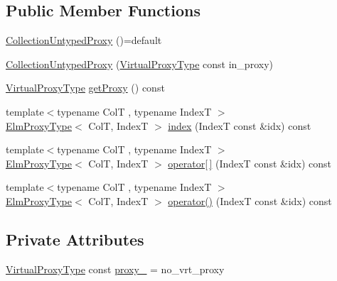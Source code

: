 \subsection*{Public Member Functions}
\begin{DoxyCompactItemize}
\item 
\hyperlink{structvt_1_1vrt_1_1collection_1_1_collection_untyped_proxy_a68c96056ba9d23597086a454e11e4125}{Collection\+Untyped\+Proxy} ()=default
\item 
\hyperlink{structvt_1_1vrt_1_1collection_1_1_collection_untyped_proxy_a8f50964f232f0bf175682933f5c29652}{Collection\+Untyped\+Proxy} (\hyperlink{namespacevt_a1b417dd5d684f045bb58a0ede70045ac}{Virtual\+Proxy\+Type} const in\+\_\+proxy)
\item 
\hyperlink{namespacevt_a1b417dd5d684f045bb58a0ede70045ac}{Virtual\+Proxy\+Type} \hyperlink{structvt_1_1vrt_1_1collection_1_1_collection_untyped_proxy_a4ccee923016e883cd6b131d2ffc156b6}{get\+Proxy} () const
\item 
{\footnotesize template$<$typename ColT , typename IndexT $>$ }\\\hyperlink{structvt_1_1vrt_1_1collection_1_1_collection_untyped_proxy_abf73984f3a31218515f9f4806f41cef5}{Elm\+Proxy\+Type}$<$ ColT, IndexT $>$ \hyperlink{structvt_1_1vrt_1_1collection_1_1_collection_untyped_proxy_a374fa73d81e8cf2fff9f2b9a494db3c8}{index} (IndexT const \&idx) const
\item 
{\footnotesize template$<$typename ColT , typename IndexT $>$ }\\\hyperlink{structvt_1_1vrt_1_1collection_1_1_collection_untyped_proxy_abf73984f3a31218515f9f4806f41cef5}{Elm\+Proxy\+Type}$<$ ColT, IndexT $>$ \hyperlink{structvt_1_1vrt_1_1collection_1_1_collection_untyped_proxy_a04bd48b1cc06e903b520d91d09b01bb3}{operator\mbox{[}$\,$\mbox{]}} (IndexT const \&idx) const
\item 
{\footnotesize template$<$typename ColT , typename IndexT $>$ }\\\hyperlink{structvt_1_1vrt_1_1collection_1_1_collection_untyped_proxy_abf73984f3a31218515f9f4806f41cef5}{Elm\+Proxy\+Type}$<$ ColT, IndexT $>$ \hyperlink{structvt_1_1vrt_1_1collection_1_1_collection_untyped_proxy_a4db7a90e93f3e3a65544c6d947e0985d}{operator()} (IndexT const \&idx) const
\end{DoxyCompactItemize}
\subsection*{Private Attributes}
\begin{DoxyCompactItemize}
\item 
\hyperlink{namespacevt_a1b417dd5d684f045bb58a0ede70045ac}{Virtual\+Proxy\+Type} const \hyperlink{structvt_1_1vrt_1_1collection_1_1_collection_untyped_proxy_ae76427f1f00db9e26a385c245dc9189d}{proxy\+\_\+} = no\+\_\+vrt\+\_\+proxy
\end{DoxyCompactItemize}


